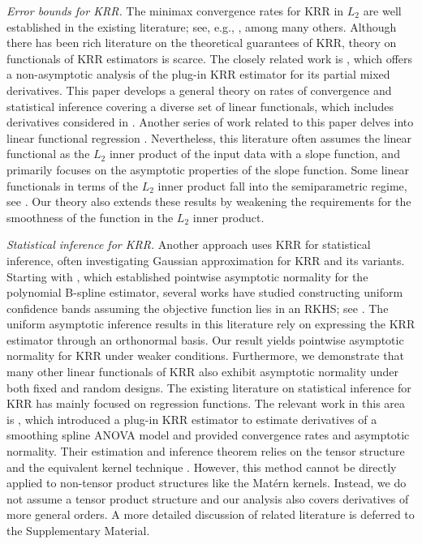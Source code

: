 \documentclass[12pt]{article}
\theoremstyle{plain}
\theoremstyle{remark}
\begin{document}
\textit{Error bounds for KRR.} The minimax convergence rates for KRR in $L_2$  are well established in the existing literature; see, e.g., \cite{caponnetto2007optimal,smale2007learning,steinwart2009optimal,mendelson2010regularization}, among many others.  Although there has been rich literature on the theoretical guarantees of KRR, theory on functionals of KRR estimators is scarce. The closely related work is \cite{liu2023estimation}, which offers a non-asymptotic analysis of the plug-in KRR estimator for its partial mixed derivatives. This paper develops a general theory on rates of convergence and statistical inference covering a diverse set of linear functionals, which includes derivatives considered in \cite{liu2023estimation}.  Another series of work related to this paper delves into linear functional regression \citep{cai2012minimax,yuan2010reproducing}. Nevertheless, this literature often assumes the linear functional as the $L_2$ inner product of the input data with a slope function, and primarily focuses on the asymptotic properties of the slope function.  Some linear functionals in terms of the $L_2$ inner product fall into the semiparametric regime, see \cite{kosorok2008introduction,geer2000empirical}. Our theory also extends these results by weakening the requirements for the smoothness of the function in the $L_2$ inner product. 

\textit{Statistical inference for KRR.}  Another approach uses KRR for statistical inference, often investigating Gaussian approximation for KRR and its variants. Starting with \cite{huang2003local}, which established pointwise asymptotic normality for the polynomial B-spline estimator, several works have studied constructing uniform confidence bands assuming the objective function lies in an RKHS; see \citep{shang2013local,cheng2013joint, zhao2021statistical}. The uniform asymptotic inference results in this literature rely on expressing the KRR estimator through an orthonormal basis. Our result yields pointwise asymptotic normality for KRR under weaker conditions.  Furthermore, we demonstrate that many other linear functionals of KRR also exhibit  asymptotic normality under both fixed and random designs. The existing literature on statistical inference for KRR has mainly focused on regression functions. The relevant work in this area is \cite{liu2023estimationanova}, which introduced a plug-in KRR estimator to estimate derivatives of a smoothing spline ANOVA model and provided convergence rates and asymptotic normality. Their estimation and inference theorem relies on the tensor structure and the equivalent kernel technique \citep{messer1993new,silverman1984spline}. However, this method cannot be directly applied to non-tensor product structures like the Mat\'ern kernels. Instead, we do not assume a tensor product structure and our analysis also covers derivatives of more general orders. A more detailed discussion of related literature is deferred to the Supplementary Material.
\end{document}
